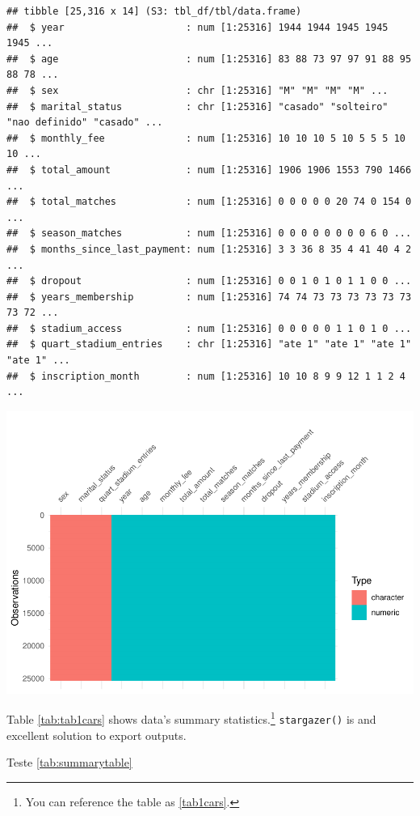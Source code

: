 \documentclass[
  12pt,
]{article}
\begin{document}
\begin{verbatim}
## tibble [25,316 x 14] (S3: tbl_df/tbl/data.frame)
##  $ year                     : num [1:25316] 1944 1944 1945 1945 1945 ...
##  $ age                      : num [1:25316] 83 88 73 97 97 91 88 95 88 78 ...
##  $ sex                      : chr [1:25316] "M" "M" "M" "M" ...
##  $ marital_status           : chr [1:25316] "casado" "solteiro" "nao definido" "casado" ...
##  $ monthly_fee              : num [1:25316] 10 10 10 5 10 5 5 5 10 10 ...
##  $ total_amount             : num [1:25316] 1906 1906 1553 790 1466 ...
##  $ total_matches            : num [1:25316] 0 0 0 0 0 20 74 0 154 0 ...
##  $ season_matches           : num [1:25316] 0 0 0 0 0 0 0 0 6 0 ...
##  $ months_since_last_payment: num [1:25316] 3 3 36 8 35 4 41 40 4 2 ...
##  $ dropout                  : num [1:25316] 0 0 1 0 1 0 1 1 0 0 ...
##  $ years_membership         : num [1:25316] 74 74 73 73 73 73 73 73 73 72 ...
##  $ stadium_access           : num [1:25316] 0 0 0 0 0 1 1 0 1 0 ...
##  $ quart_stadium_entries    : chr [1:25316] "ate 1" "ate 1" "ate 1" "ate 1" ...
##  $ inscription_month        : num [1:25316] 10 10 8 9 9 12 1 1 2 4 ...
\end{verbatim}

\includegraphics{articleCustomerDropoutMembership_files/figure-latex/get_data-1.pdf}

Table \ref{tab:tab1cars} shows data's summary statistics.\footnote{You can reference the table as \ref{tab1cars}.} \texttt{stargazer()} is
and excellent solution to export outputs.

Teste \ref{tab:summarytable}
\end{document}
